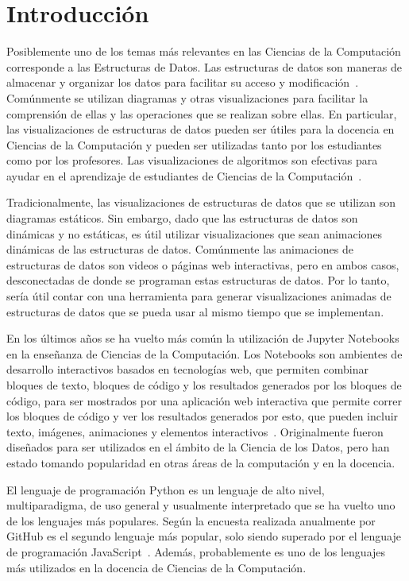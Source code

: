 \chapter{Introducción}

Posiblemente uno de los temas más relevantes en las Ciencias de la Computación corresponde a las Estructuras de Datos. Las estructuras de datos son maneras de almacenar y organizar los datos para facilitar su acceso y modificación~\cite{Algorithms}. Comúnmente se utilizan diagramas y otras visualizaciones para facilitar la comprensión de ellas y las operaciones que se realizan sobre ellas. En particular, las visualizaciones de estructuras de datos pueden ser útiles para la docencia en Ciencias de la Computación y pueden ser utilizadas tanto por los estudiantes como por los profesores. Las visualizaciones de algoritmos son efectivas para ayudar en el aprendizaje de estudiantes de Ciencias de la Computación~\cite{Hundhausen2002}.

Tradicionalmente, las visualizaciones de estructuras de datos que se utilizan son diagramas estáticos. Sin embargo, dado que las estructuras de datos son dinámicas y no estáticas, es útil utilizar visualizaciones que sean animaciones dinámicas de las estructuras de datos. Comúnmente las animaciones de estructuras de datos son videos o páginas web interactivas, pero en ambos casos, desconectadas de donde se programan estas estructuras de datos. Por lo tanto, sería útil contar con una herramienta para generar visualizaciones animadas de estructuras de datos que se pueda usar al mismo tiempo que se implementan.

En los últimos años se ha vuelto más común la utilización de Jupyter Notebooks en la enseñanza de Ciencias de la Computación. Los Notebooks son ambientes de desarrollo interactivos basados en tecnologías web, que permiten combinar bloques de texto, bloques de código y los resultados generados por los bloques de código, para ser mostrados por una aplicación web interactiva que permite correr los bloques de código y ver los resultados generados por esto, que pueden incluir texto, imágenes, animaciones y elementos interactivos~\cite{kluyver2016jupyter}. Originalmente fueron diseñados para ser utilizados en el ámbito de la Ciencia de los Datos, pero han estado tomando popularidad en otras áreas de la computación y en la docencia.

El lenguaje de programación Python es un lenguaje de alto nivel, multiparadigma, de uso general y usualmente interpretado que se ha vuelto uno de los lenguajes más populares. Según la encuesta realizada anualmente por GitHub es el segundo lenguaje más popular, solo siendo superado por el lenguaje de programación JavaScript~\cite{encuesta-github}. Además, probablemente es uno de los lenguajes más utilizados en la docencia de Ciencias de la Computación.


